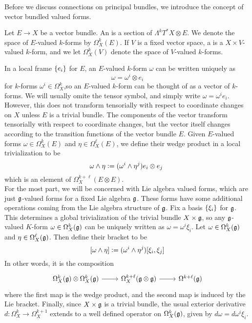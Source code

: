 Before we discuss connections on principal bundles, we introduce the concept of
vector bundled valued forms.
%
\begin{defn}
Let $E \to X$ be a vector bundle. An  is
a section of $\Lambda^kT^*X\otimes E$. We denote the space of $E$-valued $k$-forms
by $\Omega^k_X(E)$. If $V$ is a fixed vector space, a  is a $X\times V$-valued $k$-form, and we let $\Omega^k_X(V)$ denote the
space of $V$-valued $k$-forms.
\end{defn}
%
In a local frame $\left\lbrace e_i \right\rbrace$ for $E$, an $E$-valued $k$-form $\omega$ can be
written uniquely as
\[
\omega = \omega^i \otimes e_i
\]
for $k$-forms $\omega^i \in \Omega^k_X$,so an $E$-valued $k$-form can be thought of
as a vector of $k$-forms. We will usually omite the tensor symbol, and simply
write $\omega = \omega^ie_i$. However, this does not transform tensorially with
respect to coordinate changes on $X$ unless $E$ is a trivial bundle. The
components of the vector transform tensorially with respect to coordinate changes,
but the vector itself changes according to the transition functions of the vector
bundle $E$. Given $E$-valued forms $\omega \in \Omega^k_X(E)$ and
$\eta \in \Omega^\ell_X(E)$, we define their wedge product in a local trivialization to
be
\[
\omega \wedge \eta \vcentcolon=  (\omega^i \wedge \eta^j)e_i \otimes e_j\
\]
which is an element of $\Omega^{k+\ell}_X(E \otimes E)$. \\

For the most part, we will be concerned with Lie algebra valued forms,
which are just $\mathfrak{g}$-valued forms for a fixed Lie algebra $\mathfrak{g}$. These
forms have some additional operations coming from the Lie algebra structure
of $\mathfrak{g}$. Fix a basis $\left\lbrace \xi_i \right\rbrace$ for $\mathfrak{g}$. This determines a global
trivialization of the trivial bundle $X \times \mathfrak{g}$, so any $\mathfrak{g}$-valued
$K$-form $\omega \in \Omega^k_X(\mathfrak{g})$ can be uniquely written as
$\omega = \omega^i\xi_i$. Let
$\omega \in \Omega^k_X(\mathfrak{g})$ and $\eta \in \Omega^\ell_X(\mathfrak{g})$. Then define their
bracket to be
\[
[\omega\wedge\eta] \vcentcolon= (\omega^i \wedge \eta^j)[\xi_i,\xi_j]
\]
In other words, it is the composition
\[\begin{tikzcd}
\Omega^k_X(\g) \otimes \Omega^k_X(\g) \ar[r] & \Omega^{k+\ell}_X(\g \otimes \g) \ar[r] &
\Omega^{k+\ell}(\g)
\end{tikzcd}\]
where the first map is the wedge product, and the second map is induced by the
Lie bracket. Finally, since $X \times \mathfrak{g}$ is a trivial bundle, the
usual exterior derivative $d : \Omega^k_X \to \Omega^{k+1}_X$ extends to
a well defined operator on $\Omega^k_X(\mathfrak{g})$, given by
$d\omega = d\omega^i\xi_i$. \\

